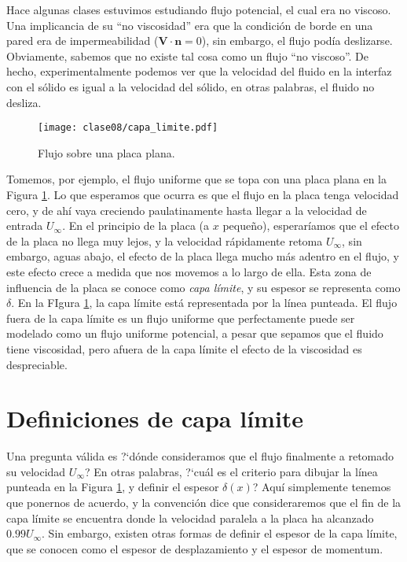 Hace algunas clases estuvimos estudiando flujo potencial, el cual era no viscoso.
Una implicancia de su ``no viscosidad'' era que la condición de borde en una pared era de impermeabilidad ($\mathbf{V}\cdot\mathbf{n}=0$), sin embargo, el flujo podía deslizarse.
Obviamente, sabemos que no existe tal cosa como un flujo ``no viscoso''. 
De hecho, experimentalmente podemos ver que la velocidad del fluido en la interfaz con el sólido es igual a la velocidad del sólido, en otras palabras, el fluido no desliza.
%
\begin{figure}[!h]
\centering
\texttt{[image: clase08/capa\_limite.pdf]}
\caption{Flujo sobre una placa plana.}
\label{fig:capa_limite}
\end{figure}
%
Tomemos, por ejemplo, el flujo uniforme que se topa con una placa plana en la Figura \ref{fig:capa_limite}.
Lo que esperamos que ocurra es que el flujo en la placa tenga velocidad cero, y de ahí vaya creciendo paulatinamente hasta llegar a la velocidad de entrada $U_\infty$.
En el principio de la placa (a $x$ pequeño), esperaríamos que el efecto de la placa no llega muy lejos, y la velocidad rápidamente retoma $U_\infty$, sin embargo, aguas abajo, el efecto de la placa llega mucho más adentro en el flujo, y este efecto crece a medida que nos movemos a lo largo de ella.
Esta zona de influencia de la placa se conoce como \emph{capa límite}, y su espesor se representa como $\delta$.
En la FIgura \ref{fig:capa_limite}, la capa límite está representada por la línea punteada.
El flujo fuera de la capa límite es un flujo uniforme que perfectamente puede ser modelado como un flujo uniforme potencial, a pesar que sepamos que el fluido tiene viscosidad, pero afuera de la capa límite el efecto de la viscosidad es despreciable.

\section*{Definiciones de capa límite}
Una pregunta válida es \mbox{?`}dónde consideramos que el flujo finalmente a retomado su velocidad $U_\infty$? 
En otras palabras, \mbox{?`}cuál es el criterio para dibujar la línea punteada en la Figura \ref{fig:capa_limite}, y definir el espesor $\delta(x)$?
Aquí simplemente tenemos que ponernos de acuerdo, y la convención dice que consideraremos que el fin de la capa límite se encuentra donde la velocidad paralela a la placa ha alcanzado $0.99U_\infty$.
Sin embargo, existen otras formas de definir el espesor de la capa límite, que se conocen como el espesor de desplazamiento y el espesor de momentum.

